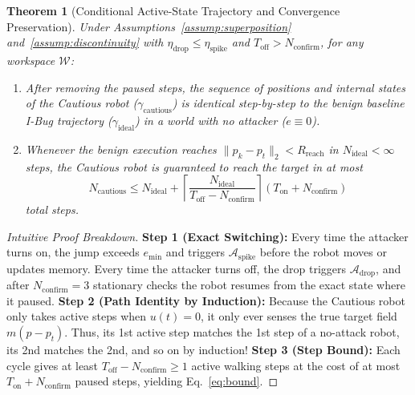 \documentclass[11pt, a4paper]{article}
\newtheorem{theorem}{Theorem}
\begin{document}
\begin{theorem}[Conditional Active-State Trajectory and Convergence Preservation]
\label{thm:cautious}
Under Assumptions~\ref{assump:superposition} and~\ref{assump:discontinuity} with $\eta_{\text{drop}} \le \eta_{\text{spike}}$ and $T_{\text{off}} > N_{\text{confirm}}$, for any workspace $\mathcal{W}$:
\begin{enumerate}
    \item[(i)] After removing the paused steps, the sequence of positions and internal states of the Cautious robot ($\gamma_{\text{cautious}}$) is identical step-by-step to the benign baseline I-Bug trajectory ($\gamma_{\text{ideal}}$) in a world with no attacker ($e \equiv 0$).
    \item[(ii)] Whenever the benign execution reaches $\|p_k - p_t\|_2 < R_{\text{reach}}$ in $N_{\text{ideal}} < \infty$ steps, the Cautious robot is guaranteed to reach the target in at most
    \begin{equation}
        N_{\text{cautious}} \le N_{\text{ideal}} + \left\lceil \frac{N_{\text{ideal}}}{T_{\text{off}} - N_{\text{confirm}}} \right\rceil (T_{\text{on}} + N_{\text{confirm}})
        \label{eq:bound}
    \end{equation}
    total steps.
\end{enumerate}
\end{theorem}

\begin{proof}[Intuitive Proof Breakdown]
\textbf{Step 1 (Exact Switching):} Every time the attacker turns on, the jump exceeds $e_{\min}$ and triggers $\mathcal{A}_{\text{spike}}$ before the robot moves or updates memory. Every time the attacker turns off, the drop triggers $\mathcal{A}_{\text{drop}}$, and after $N_{\text{confirm}} = 3$ stationary checks the robot resumes from the exact state where it paused.
\textbf{Step 2 (Path Identity by Induction):} Because the Cautious robot only takes active steps when $u(t) = 0$, it only ever senses the true target field $m(p - p_t)$. Thus, its 1st active step matches the 1st step of a no-attack robot, its 2nd matches the 2nd, and so on by induction!
\textbf{Step 3 (Step Bound):} Each cycle gives at least $T_{\text{off}} - N_{\text{confirm}} \ge 1$ active walking steps at the cost of at most $T_{\text{on}} + N_{\text{confirm}}$ paused steps, yielding Eq.~\eqref{eq:bound}.
\end{proof}
\end{document}

